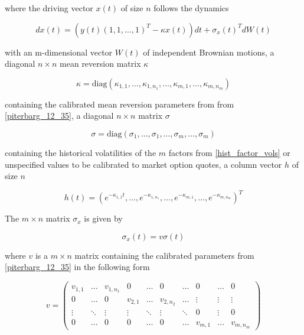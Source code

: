 \documentclass{amsart}
\theoremstyle{plain}
\numberwithin{equation}{section}
\begin{document}
where the driving vector $x(t)$ of size $n$ follows the dynamics

\begin{equation}
dx(t) = (y(t) (1,1,\ldots,1)^T - \kappa x(t)) dt + \sigma_x(t)^T dW(t)
\end{equation}

with an m-dimensional vector $W(t)$ of independent Brownian motions, a diagonal $n \times n$ mean reversion matrix
$\kappa$

\begin{equation}
\kappa = \text{diag}( \kappa_{1,1}, \ldots, \kappa_{1,n_1}, \ldots, \kappa_{m,1}, \ldots, \kappa_{m,n_m} )
\end{equation}

containing the calibrated mean reversion parameters from from \ref{piterbarg_12_35}, a diagonal $n \times n$ matrix
$\sigma$

\begin{equation}
\sigma = \text{diag}( \sigma_{1}, \ldots, \sigma_{1}, \ldots, \sigma_{m}, \ldots, \sigma_{m} )
\end{equation}

containing the historical volatilities of the $m$ factors from \ref{hist_factor_vols} or unspecified values to be
calibrated to market option quotes, a column vector $h$ of size $n$

\begin{equation}
h(t) = ( e^{-\kappa_{1,1}t}, \ldots, e^{-\kappa_{1,n_1}}, \ldots, e^{-\kappa_{m,1}}, \ldots, e^{-\kappa_{m,n_m}} )^T
\end{equation}

The $m \times n$ matrix $\sigma_x$ is given by

\begin{equation}
\sigma_x(t) = v \sigma(t)
\end{equation}

where $v$ is a $m \times n$ matrix containing the calibrated parameters from \ref{piterbarg_12_35} in the following form

\begin{equation}
  v = \begin{pmatrix}
       v_{1,1} & \ldots & v_{1,n_1} & 0      & \ldots & 0        & \ldots & 0      & \ldots & 0 \\
       0      & \ldots & 0        & v_{2,1} & \ldots & v_{2,n_2} & \ldots & \vdots & \vdots & \vdots \\
       \vdots & \ddots & \vdots   & \vdots & \ddots & \vdots   & \ddots & 0      & \vdots & 0 \\
       0      & \ldots & 0        & 0      & \ldots & 0        & \ldots & v_{m,1} & \ldots & v_{m,n_m}
       \end{pmatrix}
\end{equation}
\end{document}
